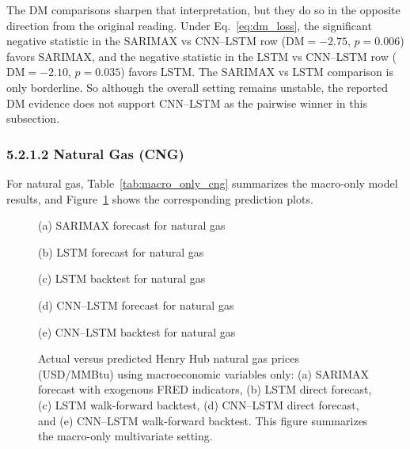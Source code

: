 \documentclass[pdflatex,sn-mathphys-num]{sn-jnl}%
\theoremstyle{thmstyleone}%
\theoremstyle{thmstyletwo}%
\theoremstyle{thmstylethree}%
\begin{document}
The DM comparisons sharpen that interpretation, but they do so in the opposite direction from the original reading. Under Eq.~\ref{eq:dm_loss}, the significant negative statistic in the SARIMAX vs CNN--LSTM row ($\mathrm{DM}=-2.75$, $p=0.006$) favors SARIMAX, and the negative statistic in the LSTM vs CNN--LSTM row ($\mathrm{DM}=-2.10$, $p=0.035$) favors LSTM. The SARIMAX vs LSTM comparison is only borderline. So although the overall setting remains unstable, the reported DM evidence does not support CNN--LSTM as the pairwise winner in this subsection.

\subsubsection*{5.2.1.2 Natural Gas (CNG)}
For natural gas, Table~\ref{tab:macro_only_cng} summarizes the macro-only model results, and Figure~\ref{fig:macro_only_cng_plots} shows the corresponding prediction plots.

\begin{figure}[h]
\centering
\begin{minipage}[t]{0.495\textwidth}
\centering

\small (a) SARIMAX forecast for natural gas
\end{minipage}\hfill
\begin{minipage}[t]{0.495\textwidth}
\centering

\small (b) LSTM forecast for natural gas
\end{minipage}

\vspace{0.5em}

\begin{minipage}[t]{0.495\textwidth}
\centering

\small (c) LSTM backtest for natural gas
\end{minipage}\hfill
\begin{minipage}[t]{0.495\textwidth}
\centering

\small (d) CNN--LSTM forecast for natural gas
\end{minipage}

\vspace{0.5em}

\begin{minipage}[t]{0.495\textwidth}
\centering

\small (e) CNN--LSTM backtest for natural gas
\end{minipage}
\caption{Actual versus predicted Henry Hub natural gas prices (USD/MMBtu) using macroeconomic variables only: (a) SARIMAX forecast with exogenous FRED indicators, (b) LSTM direct forecast, (c) LSTM walk-forward backtest, (d) CNN--LSTM direct forecast, and (e) CNN--LSTM walk-forward backtest. This figure summarizes the macro-only multivariate setting.}
\label{fig:macro_only_cng_plots}
\end{figure}
\end{document}
